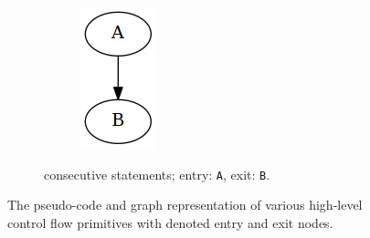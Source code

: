 \begin{figure}[htbp]
\begin{subfigure}[ht]{0.24\textwidth}
\begin{subfigure}[ht]{0.35\textwidth}
			\includegraphics[width=\textwidth]{inc/primitives/list.png}
		\end{subfigure}
		\caption{consecutive statements; entry: \texttt{A}, exit: \texttt{B}.}
		\label{fig:list_graph_representation}
	\end{subfigure}
	\caption{The pseudo-code and graph representation of various high-level control flow primitives with denoted entry and exit nodes.}
	\label{fig:graph_representations}
\end{figure}

